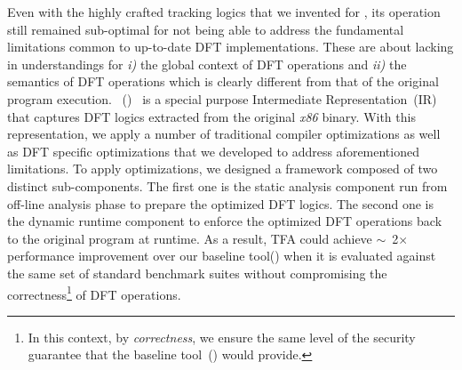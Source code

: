 \documentclass[letterpaper, 10pt]{article}
\begin{document}
\begin{small}

Even with the highly crafted tracking logics that we invented for \libdft, its
operation still remained sub-optimal for not being able to address the
fundamental limitations common to up-to-date DFT implementations. 
%
These are about lacking in understandings for {\it i)} the global context of
DFT operations and {\it ii)} the semantics of DFT operations which is clearly
different from that of the original program execution.
%
\TFAFull~(\TFA)~\cite{tfa:2012ndss} is a special purpose Intermediate
Representation~(IR) that captures DFT logics extracted from the original {\it
x86} binary. With this representation, we apply a number of traditional
compiler optimizations as well as DFT specific optimizations that we developed
to address aforementioned limitations.
%
To apply optimizations, we designed a framework composed of two distinct
sub-components.  The first one is the static analysis component run from
off-line analysis phase to prepare the optimized DFT logics. The second one is
the dynamic runtime component to enforce the optimized DFT operations back to
the original program at runtime.
%
%
As a result, TFA could achieve \(\sim\)~2\(\times\) performance improvement
over  our baseline tool(\libdft) when it is evaluated against the same set of
standard benchmark suites without compromising the correctness\footnote{In
        this context, by {\it correctness}, we ensure the same level of the
security guarantee that the baseline tool~(\libdft) would provide.} of DFT
operations.


\end{small}
\end{document}
